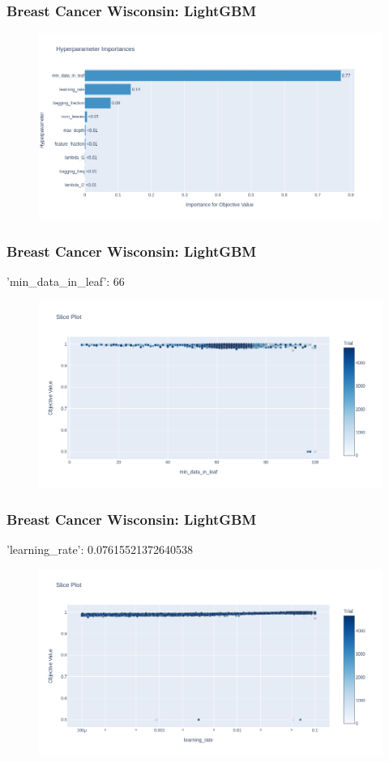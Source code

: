 \documentclass{beamer}
\begin{document}
\begin{frame}
\frametitle{Breast Cancer Wisconsin: LightGBM}
\begin{figure}[H]
 \centering
 \includegraphics[scale=0.3]{optuna_lgbm_importance_cancer.png}
\end{figure}
\end{frame}

\begin{frame}
\frametitle{Breast Cancer Wisconsin: LightGBM}
'min\_data\_in\_leaf': 66
\begin{figure}[H]
 \centering
 \includegraphics[scale=0.3]{optuna_lgbm_min_cancer.png}
\end{figure}
\end{frame}
\begin{frame}
\frametitle{Breast Cancer Wisconsin: LightGBM}
'learning\_rate': 0.07615521372640538 
\begin{figure}[H]
 \centering
 \includegraphics[scale=0.3]{optuna_lgbm_learning_cancer.png}
\end{figure}
\end{frame}
\end{document}
